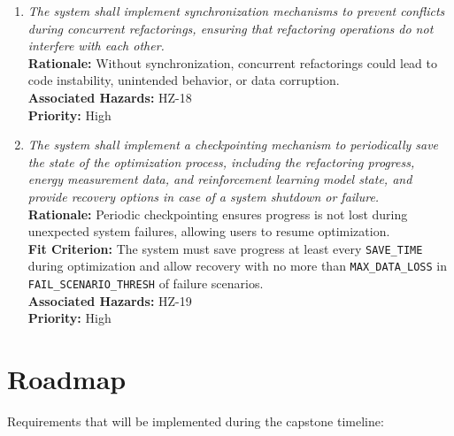 \documentclass{article}
\begin{document}
\begin{enumerate}[label=SCR \arabic*., wide=0pt, leftmargin=*]
    \item \emph{The system shall implement synchronization mechanisms to prevent conflicts during concurrent refactorings, ensuring that refactoring operations do not interfere with each other.}\\
    {\bf Rationale:} Without synchronization, concurrent refactorings could lead to code instability, unintended behavior, or data corruption.\\
    {\bf Associated Hazards:} HZ-18\\
    {\bf Priority:} High

    \item \emph{The system shall implement a checkpointing mechanism to periodically save the state of the optimization process, including the refactoring progress, energy measurement data, and reinforcement learning model state, and provide recovery options in case of a system shutdown or failure.}\\
    {\bf Rationale:} Periodic checkpointing ensures progress is not lost during unexpected system failures, allowing users to resume optimization.\\
    {\bf Fit Criterion:} The system must save progress at least every \texttt{SAVE\_TIME} during optimization and allow recovery with no more than \texttt{MAX\_DATA\_LOSS} in \texttt{FAIL\_SCENARIO\_THRESH} of failure scenarios.\\
    {\bf Associated Hazards:} HZ-19\\
    {\bf Priority:} High

\end{enumerate}

\section{Roadmap}

Requirements that will be implemented during the capstone timeline:
\end{document}
